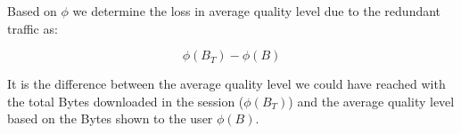 Based on $\phi$ we determine the loss in average quality level due to the redundant traffic as:

\begin{equation}
\phi(B_T) - \phi(B)
\end{equation}

It is the difference between the average quality level we could have reached with the total Bytes downloaded in the session ($\phi(B_T)$) and the average quality level based on the Bytes shown to the user $\phi(B)$.